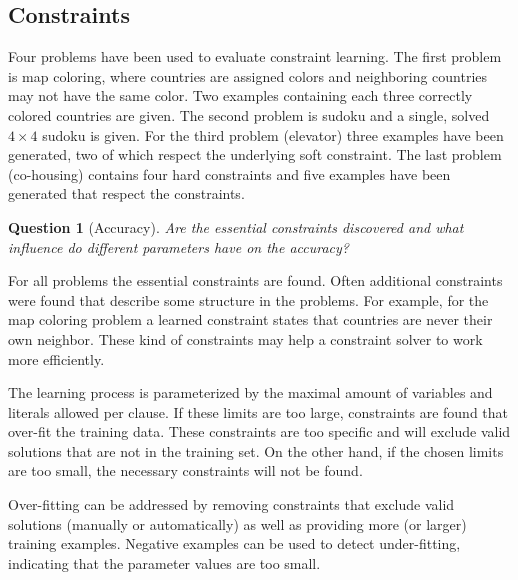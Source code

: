 \documentclass[letterpaper]{article}
\newtheorem{question}{Question}
\theoremstyle{definition}
\begin{document}
\subsection{Constraints}
Four problems have been used to evaluate constraint learning.
The first problem is map coloring, where countries are assigned colors and neighboring countries may not have the same color.
Two examples containing each three correctly colored countries are given.
The second problem is sudoku and a single, solved $4 \times 4$ sudoku is given.
For the third problem (elevator) three examples have been generated, two of which respect the underlying soft constraint.
The last problem (co-housing) contains four hard constraints and five examples have been generated that respect the constraints.

\begin{question}[Accuracy]
  Are the essential constraints discovered and what influence do different parameters have on the accuracy?
\end{question}
For all problems the essential constraints are found.
Often additional constraints were found that describe some structure in the problems.
For example, for the map coloring problem a learned constraint states that countries are never their own neighbor.
These kind of constraints may help a constraint solver to work more efficiently.

The learning process is parameterized by the maximal amount of variables and literals allowed per clause.
If these limits are too large, constraints are found that over-fit the training data.
These constraints are too specific and will exclude valid solutions that are not in the training set.
On the other hand, if the chosen limits are too small, the necessary constraints will not be found.

Over-fitting can be addressed by removing constraints that exclude valid solutions (manually or automatically) as well as providing more (or larger) training examples.
Negative examples can be used to detect under-fitting, indicating that the parameter values are too small.
\end{document}
